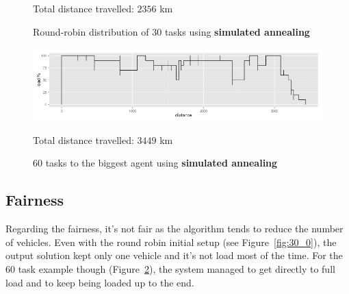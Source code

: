 \documentclass[11pt,a4paper]{article}
\begin{document}
\begin{figure}[ht!]
    \begin{center}
    \caption{
        Round-robin distribution of $30$ tasks using \textbf{simulated annealing}
    }{
        Total distance travelled: $2356$ km
    }
    \label{fig:30}
    \end{center}
\end{figure}

\begin{figure}[ht!]
    \begin{center}
    \includegraphics[width=.8\textwidth]{plan_3449_1.png}
    \caption{
        $60$ tasks to the biggest agent using \textbf{simulated annealing}
    }{
        Total distance travelled: $3449$ km
    }
    \label{fig:60}
    \end{center}
\end{figure}


\subsection*{Fairness}

Regarding the fairness, it's not fair as the algorithm tends to reduce the
number of vehicles. Even with the round robin initial setup (see
Figure~\ref{fig:30_0}), the output solution
kept only one vehicle and it's not load most of the time. For the $60$ task
example though (Figure~\ref{fig:60}), the system managed to get directly to full
load and to keep being loaded up to the end.
\end{document}
